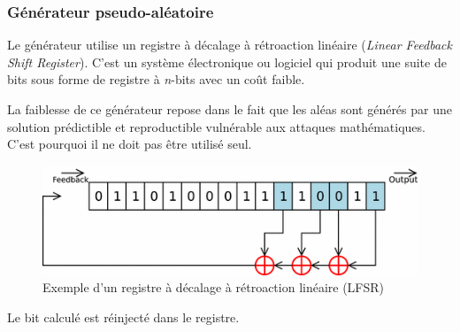 \documentclass[12pt, a4paper]{article}
\begin{document}
	\subsubsection{Générateur pseudo-aléatoire}
	Le générateur utilise un registre à décalage à rétroaction linéaire
	(\textit{Linear Feedback Shift Register}). C'est un système électronique ou
	logiciel qui produit une suite de bits sous forme de registre à
	\textit{n}-bits avec un coût faible.
	\par
	La faiblesse de ce générateur repose dans le fait que les aléas sont générés
	par une solution prédictible et reproductible vulnérable aux attaques
	mathématiques. C'est pourquoi il ne doit pas être utilisé seul.
	\begin{figure}[!ht]
		\centering
		\includegraphics{images/Lfsr}
		\caption{Exemple d'un registre à décalage à rétroaction linéaire (LFSR)}
		\label{fig:lfsr}
	\end{figure}
	Le bit calculé est réinjecté dans le registre.
\end{document}

